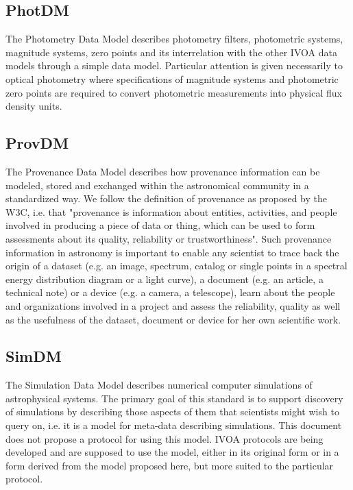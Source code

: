 \documentclass[11pt,a4paper]{ivoa}
\begin{document}
\subsection{PhotDM}

The Photometry Data Model describes photometry filters, photometric systems, magnitude 
systems, zero points and its interrelation with the other IVOA data models through a 
simple data model. Particular attention is given necessarily to optical photometry where 
specifications of magnitude systems and photometric zero points are required to convert 
photometric measurements into physical flux density units.

\subsection{ProvDM}

The Provenance Data Model describes how provenance information can be modeled, stored 
and exchanged within the astronomical community in a standardized way. We follow the 
definition of provenance as proposed by the W3C, i.e. that "provenance is information 
about entities, activities, and people involved in producing a piece of data or thing, 
which can be used to form assessments about its quality, reliability or trustworthiness".
Such provenance information in astronomy is important to enable any scientist to trace 
back the origin of a dataset (e.g. an image, spectrum, catalog or single points in a 
spectral energy distribution diagram or a light curve), a document (e.g. an article, a 
technical note) or a device (e.g. a camera, a telescope), learn about the people and 
organizations involved in a project and assess the reliability, quality as well as the 
usefulness of the dataset, document or device for her own scientific work. 

\subsection{SimDM}

The Simulation Data Model describes numerical computer simulations of astrophysical systems. 
The primary goal of this standard is to support discovery of simulations by describing those 
aspects of them that scientists might wish to query on, i.e. it is a model for meta-data 
describing simulations. This document does not propose a protocol for using this model. 
IVOA protocols are being developed and are supposed to use the model, either in its original 
form or in a form derived from the model proposed here, but more suited to the particular protocol. 
\end{document}
